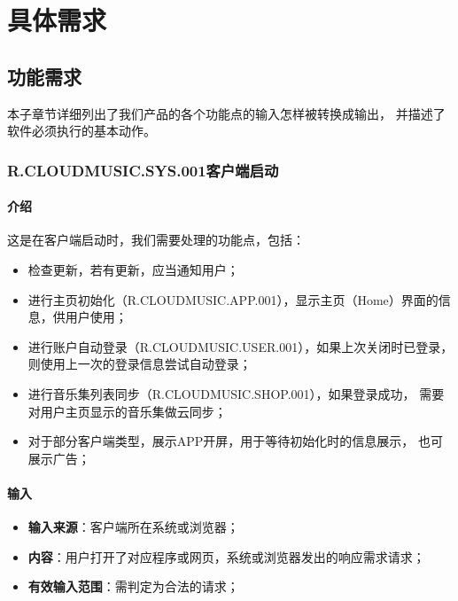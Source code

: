 \chapter{具体需求}


\section{功能需求}

本子章节详细列出了我们产品的各个功能点的输入怎样被转换成输出，
	并描述了软件必须执行的基本动作。

\subsection{R.CLOUDMUSIC.SYS.001客户端启动}
\subsubsection{介绍}
	这是在客户端启动时，我们需要处理的功能点，包括：
	\begin{itemize}
		\item 检查更新，若有更新，应当通知用户；
		\item 进行主页初始化（R.CLOUDMUSIC.APP.001），显示主页（Home）界面的信息，供用户使用；
		\item 进行账户自动登录（R.CLOUDMUSIC.USER.001），如果上次关闭时已登录，
			则使用上一次的登录信息尝试自动登录；
		\item 进行音乐集列表同步（R.CLOUDMUSIC.SHOP.001），如果登录成功，
			需要对用户主页显示的音乐集做云同步；
		\item 对于部分客户端类型，展示APP开屏，用于等待初始化时的信息展示，
			也可展示广告；
	\end{itemize}
\subsubsection{输入}
	\begin{itemize}
		\item \textbf{输入来源}：客户端所在系统或浏览器；
		\item \textbf{内容}：用户打开了对应程序或网页，系统或浏览器发出的响应需求请求；
		\item \textbf{有效输入范围}：需判定为合法的请求；
	\end{itemize}
